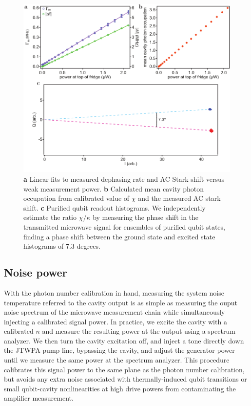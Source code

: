\begin{figure}
\begin{center}
\includegraphics[width=6in]{twpa_exp/gamma_and_stark}
\end{center}
\caption[$\chi$ calibration, two ways]{\textbf{a} Linear fits to measured dephasing rate and AC Stark shift versus weak measurement power.
\textbf{b} Calculated mean cavity photon occupation from calibrated value of $\chi$ and the measured AC stark shift. \textbf{c} Purified qubit readout histograms.  We independently estimate the ratio $\chi / \kappa$ by measuring the phase shift in the transmitted microwave signal for ensembles of purified qubit states, finding a phase shift between the ground state and excited state histograms of 7.3 degrees.}
\label{fig:gamma_and_stark}
\end{figure}

\subsection{Noise power}\label{s:noise_pow}

With the photon number calibration in hand, measuring the system noise temperature referred to the cavity output is as simple as measuring the ouput noise spectrum of the microwave measurement chain while simultaneously injecting a calibrated signal power.  In practice, we excite the cavity with a calibrated $\bar{n}$ and measure the resulting power at the output using a spectrum analyzer.  We then turn the cavity excitation off, and inject a tone directly down the JTWPA pump line, bypassing the cavity, and adjust the generator power until we measure the same power at the spectrum analyzer.  This procedure calibrates this signal power to the same plane as the photon number calibration, but avoids any extra noise associated with thermally-induced qubit transitions or small qubit-cavity nonlinearities at high drive powers from contaminating the amplifier measurement.

